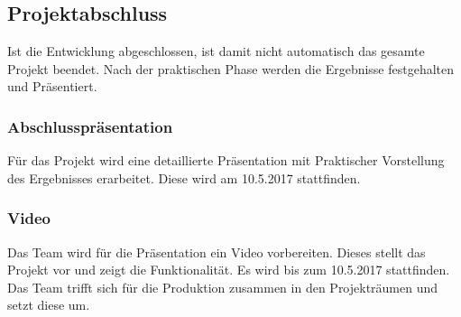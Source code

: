 \subsection{Projektabschluss}
Ist die Entwicklung abgeschlossen, ist damit nicht automatisch das gesamte Projekt beendet. Nach der praktischen Phase werden die Ergebnisse festgehalten und Präsentiert. 
\subsubsection{Abschlusspräsentation}
Für das Projekt wird eine detaillierte Präsentation mit Praktischer Vorstellung des Ergebnisses erarbeitet. Diese wird am 10.5.2017 stattfinden.
 \subsubsection{Video}
Das Team wird für die Präsentation ein Video vorbereiten. Dieses stellt das Projekt vor und zeigt die Funktionalität. Es wird bis zum 10.5.2017 stattfinden. Das Team trifft sich für die Produktion zusammen in den Projekträumen und setzt diese um.


